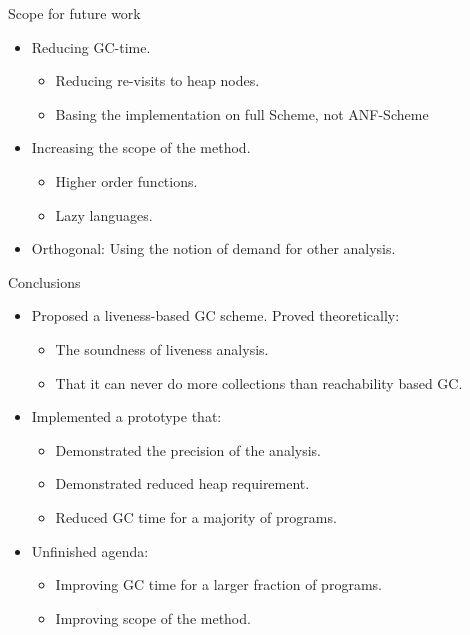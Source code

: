 \documentclass[xcolor=x11names,compress,mathserif]{beamer}
\renewcommand{\(}{\begin{columns}}
\renewcommand{\)}{\end{columns}}
\newcommand{\<}[1]{\begin{column}{#1}}
\renewcommand{\>}{\end{column}}
\begin{document}
\begin{frame}{Scope for future work}
\normalsize
  \begin{itemize}\itemsep2em
     \item Reducing GC-time.
      \begin{itemize}
      \item Reducing re-visits to heap nodes.
      \item Basing the implementation on full Scheme, not ANF-Scheme
      \end{itemize}
    \item Increasing the scope of the method.
      \begin{itemize}
      \item Higher order functions.
      \item Lazy languages.
      \end{itemize}
    \item Orthogonal: Using the notion of demand for other analysis.
  \end{itemize}
\end{frame}


\begin{frame}{Conclusions}
  \begin{itemize}\itemsep1em
  \item Proposed a liveness-based GC scheme. Proved theoretically:
    \begin{itemize}
    \item The soundness of liveness analysis.
    \item That it can never do more collections than reachability
      based GC.
    \end{itemize}
    \item Implemented a prototype that:
      \begin{itemize}
      \item Demonstrated the precision of the analysis.
      \item Demonstrated reduced heap requirement.
      \item Reduced GC time for a majority of programs.
    \end{itemize}
    \item Unfinished agenda:
      \begin{itemize}
      \item Improving GC time for a larger fraction of programs.
      \item Improving scope of the method.
    \end{itemize}
  \end{itemize}

\end{frame}
\end{document}
